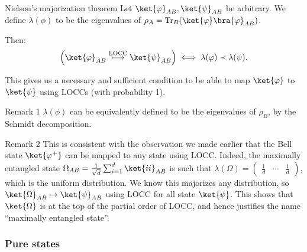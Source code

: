 \documentclass[a4paper]{article}
\begin{document}
\begin{parag}{Nielson's majorization theorem}
    Let $\ket{\phi}_{AB}, \ket{\psi}_{AB}$ be arbitrary. We define $\lambda\left(\phi\right)$ to be the eigenvalues of $\rho_A = \Tr_B\left(\ket{\phi}\bra{\phi}_{AB}\right)$. 

    Then: 
    \[\left(\ket{\phi}_{AB} \over{\longmapsto}{LOCC} \ket{\psi}_{AB}\right) \iff \lambda\left(\phi\right) \prec \lambda\left(\psi\right).\]
    
    This gives us a necessary and sufficient condition to be able to map $\ket{\phi}$ to $\ket{\psi}$ using LOCCs (with probability 1).

    \begin{subparag}{Remark 1}
        $\lambda\left(\phi\right)$ can be equivalently defined to be the eigenvalues of $\rho_B$, by the Schmidt decomposition.
    \end{subparag}

    \begin{subparag}{Remark 2}
        This is consistent with the observation we made earlier that the Bell state $\ket{\phi^+}$ can be mapped to any state using LOCC. Indeed, the maximally entangled state $\Omega_{AB} = \frac{1}{\sqrt{d}} \sum_{i=1}^{d} \ket{ii}_{AB}$ is such that $\lambda\left(\Omega\right) = \begin{pmatrix} \frac{1}{d} & \cdots & \frac{1}{d} \end{pmatrix} $, which is the uniform distribution. We know this majorizes any distribution, so $\ket{\Omega}_{AB} \mapsto \ket{\psi}_{AB}$ using LOCC for all state $\ket{\psi}$. This shows that $\ket{\Omega}$ is at the top of the partial order of LOCC, and hence justifies the name ``maximally entangled state''.
    \end{subparag}
\end{parag}

\subsubsection{Pure states}
\end{document}
